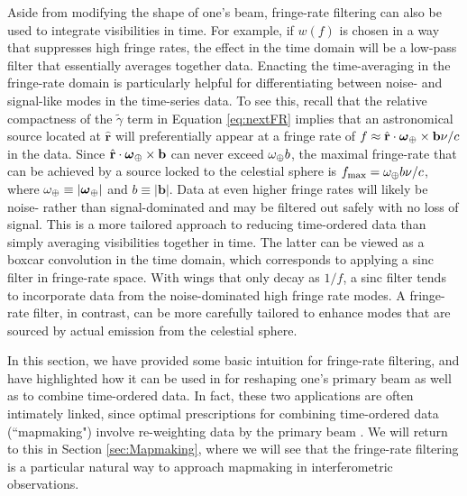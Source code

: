 \documentclass[twocolumn,apj,numberedappendix]{emulateapj}
\newcommand{\rhat}{\hat{\mathbf{r}}}
\begin{document}
Aside from modifying the shape of one's beam, fringe-rate filtering can also be used to integrate visibilities in time. For example, if $w(f)$ is chosen in a way that suppresses high fringe rates, the effect in the time domain will be a low-pass filter that essentially averages together data. Enacting the time-averaging in the fringe-rate domain is particularly helpful for differentiating between noise- and signal-like modes in the time-series data. To see this, recall that the relative compactness of the $\tilde{\gamma}$ term in Equation \eqref{eq:nextFR} implies that an astronomical source located at $\rhat$ will preferentially appear at a fringe rate of $f \approx \rhat \cdot \boldsymbol \omega_\Earth \times \mathbf{b} \nu / c $ in the data. Since $\rhat \cdot \boldsymbol \omega_\Earth \times \mathbf{b}$ can never exceed $\omega_\oplus b$, the maximal fringe-rate that can be achieved by a source locked to the celestial sphere is $f_\textrm{max} = \omega_\oplus b \nu / c$, where $\omega_\oplus \equiv | \boldsymbol \omega_\oplus|$ and $b \equiv | \mathbf{b}|$. Data at even higher fringe rates will likely be noise- rather than signal-dominated and may be filtered out safely with no loss of signal. This is a more tailored approach to reducing time-ordered data than simply averaging visibilities together in time. The latter can be viewed as a boxcar convolution in the time domain, which corresponds to applying a sinc filter in fringe-rate space. With wings that only decay as $1/f$, a sinc filter tends to incorporate data from the noise-dominated high fringe rate modes. A fringe-rate filter, in contrast, can be more carefully tailored to enhance modes that are sourced by actual emission from the celestial sphere.

In this section, we have provided some basic intuition for fringe-rate filtering, and have highlighted how it can be used in for reshaping one's primary beam as well as to combine time-ordered data. In fact, these two applications are often intimately linked, since optimal prescriptions for combining time-ordered data (``mapmaking") involve re-weighting data by the primary beam \citep{Tegmark97,Morales2009,dillon_et_al2015}. We will return to this in Section \ref{sec:Mapmaking}, where we will see that the fringe-rate filtering is a particular natural way to approach mapmaking in interferometric observations.
\end{document}
